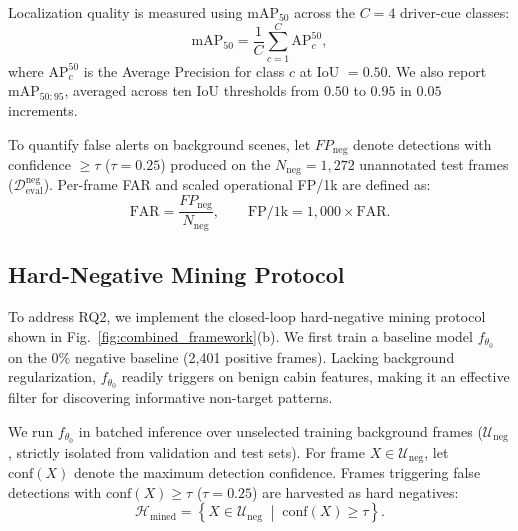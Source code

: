 \documentclass[conference]{IEEEtran}
\begin{document}
Localization quality is measured using $\text{mAP}_{50}$ across the $C = 4$ driver-cue classes:
\begin{equation}
\text{mAP}_{50} = \frac{1}{C} \sum_{c=1}^{C} \text{AP}_c^{50},
\label{eq:map}
\end{equation}
where $\text{AP}_c^{50}$ is the Average Precision for class $c$ at IoU $= 0.50$. We also report $\text{mAP}_{50:95}$, averaged across ten IoU thresholds from $0.50$ to $0.95$ in $0.05$ increments.

To quantify false alerts on background scenes, let $FP_{\mathrm{neg}}$ denote detections with confidence $\ge \tau$ ($\tau = 0.25$) produced on the $N_{\mathrm{neg}} = 1{,}272$ unannotated test frames ($\mathcal{D}_{\mathrm{eval}}^{\mathrm{neg}}$). Per-frame FAR and scaled operational FP/1k are defined as:
\begin{equation}
\text{FAR} = \frac{FP_{\mathrm{neg}}}{N_{\mathrm{neg}}}, \qquad \text{FP/1k} = 1{,}000 \times \text{FAR}.
\label{eq:far}
\end{equation}

\subsection{Hard-Negative Mining Protocol}
\label{subsec:mining}
To address RQ2, we implement the closed-loop hard-negative mining protocol shown in Fig.~\ref{fig:combined_framework}(b). We first train a baseline model $f_{\theta_0}$ on the 0\% negative baseline (2,401 positive frames). Lacking background regularization, $f_{\theta_0}$ readily triggers on benign cabin features, making it an effective filter for discovering informative non-target patterns.

We run $f_{\theta_0}$ in batched inference over unselected training background frames ($\mathcal{U}_{\mathrm{neg}}$, strictly isolated from validation and test sets). For frame $X \in \mathcal{U}_{\mathrm{neg}}$, let $\mathrm{conf}(X)$ denote the maximum detection confidence. Frames triggering false detections with $\mathrm{conf}(X) \ge \tau$ ($\tau = 0.25$) are harvested as hard negatives:
\begin{equation}
\mathcal{H}_{\mathrm{mined}} = \left\{ X \in \mathcal{U}_{\mathrm{neg}} \;\middle|\; \mathrm{conf}(X) \ge \tau \right\}.
\label{eq:mining_set}
\end{equation}
\end{document}
